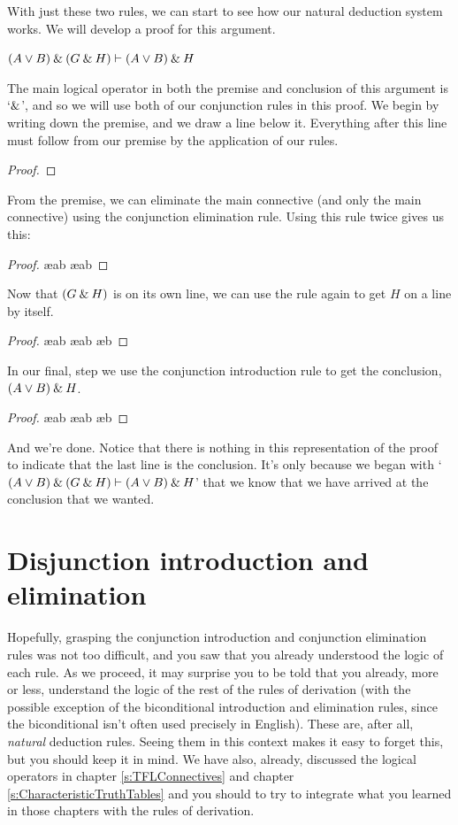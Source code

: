 With just these two rules, we can start to see how our natural deduction system works. We will develop a proof for this argument. 
\begin{earg}
\item[] $(A\vee B) \mathbin{\&} (G \mathbin{\&} H) \vdash (A\vee B)\mathbin{\&} H$
\end{earg}
The main logical operator in both the premise and conclusion of this argument is `$\mathbin{\&}$', and so we will use both of our conjunction rules in this proof. We begin by writing down the premise, and we draw a line below it. Everything after this line must follow from our premise by the application of our rules. 
\begin{proof}
	 \pr{}
\end{proof}
From the premise, we can eliminate the main connective (and only the main connective) using the conjunction elimination rule. Using this rule twice gives us this:
\begin{proof}
	 \pr{}
	 \ae{ab}
	 \ae{ab}
\end{proof}
Now that $(G\mathbin{\&} H)$ is on its own line, we can use the rule again to get $H$ on a line by itself. 
\begin{proof}
	 \pr{}
	 \ae{ab}
	 \ae{ab}
	 \ae{b}
\end{proof}
In our final, step we use the conjunction introduction rule to get the conclusion, $(A\vee B)\mathbin{\&} H$.
\begin{proof}
	 \pr{}
	 \ae{ab}
	 \ae{ab}
	 \ae{b}
	 
\end{proof}
And we're done. Notice that there is nothing in this representation of the proof to indicate that the last line is the conclusion. It's only because we began with `$(A\vee B) \mathbin{\&} (G \mathbin{\&} H) \vdash (A\vee B)\mathbin{\&} H$' that we know that we have arrived at the conclusion that we wanted.
 

\section{Disjunction introduction and elimination}\label{s:disj-rule}

Hopefully, grasping the conjunction introduction and conjunction elimination rules was not too difficult, and you saw that you already understood the logic of each rule. As we proceed, it may surprise you to be told that you already, more or less, understand the logic of the rest of the rules of derivation (with the possible exception of the biconditional introduction and elimination rules, since the biconditional isn't often used precisely in English). These are, after all, \textit{natural} deduction rules. Seeing them in this context makes it easy to forget this, but you should keep it in mind. We have also, already, discussed the logical operators in chapter \ref{s:TFLConnectives} and chapter \ref{s:CharacteristicTruthTables} and you should to try to integrate what you learned in those chapters with the rules of derivation.


